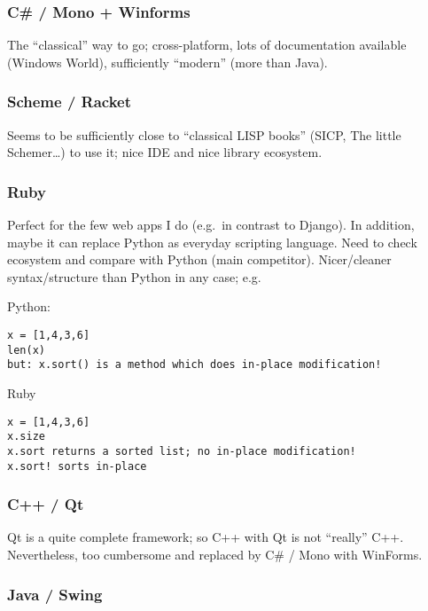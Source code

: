 \subsubsection{C\# / Mono + Winforms}\label{c-mono-winforms}

The ``classical'' way to go; cross-platform, lots of documentation
available (Windows World), sufficiently ``modern'' (more than Java).

\subsubsection{Scheme / Racket}\label{scheme-racket}

Seems to be sufficiently close to ``classical LISP books'' (SICP, The
little Schemer\ldots{}) to use it; nice IDE and nice library ecosystem.

\subsubsection{Ruby}\label{ruby}

Perfect for the few web apps I do (e.g.~in contrast to Django). In
addition, maybe it can replace Python as everyday scripting language.
Need to check ecosystem and compare with Python (main competitor).
Nicer/cleaner syntax/structure than Python in any case; e.g.

Python:

\begin{verbatim}
x = [1,4,3,6]
len(x)
but: x.sort() is a method which does in-place modification!
\end{verbatim}

Ruby

\begin{verbatim}
x = [1,4,3,6]
x.size
x.sort returns a sorted list; no in-place modification!
x.sort! sorts in-place
\end{verbatim}

\subsubsection{C++ / Qt}\label{c-qt}

Qt is a quite complete framework; so C++ with Qt is not ``really'' C++.
Nevertheless, too cumbersome and replaced by C\# / Mono with WinForms.

\subsubsection{Java / Swing}\label{java-swing}

